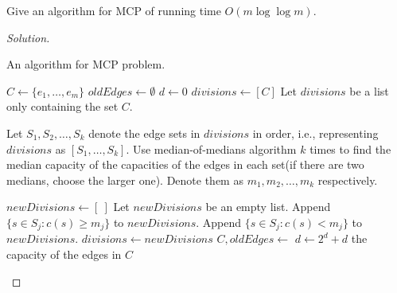     \newpage
    
    \begin{thm}{}{}
        Give an algorithm for MCP of running time $O(m\log\log m)$.
    \end{thm}
    \begin{proof}[Solution]
        \ 
        
        \begin{algorithm}
            \caption{An algorithm for MCP problem.}
            \begin{algorithmic}
                \State $C\gets \{e_1,\ldots,e_m\}$
                \State $oldEdges \gets \emptyset$
                \State $d\gets 0$
                 
                \State $divisions\gets [C]$ \Comment Let $divisions$ be a list only containing the set $C$.
                 
                
                \State Let $S_1, S_2, \ldots, S_k$ denote the edge sets in $divisions$ in order, i.e., representing $divisions$ as $[S_1, \ldots, S_k]$.
                \State Use median-of-medians algorithm $k$ times to find the median capacity of the capacities of the edges in each set(if there are two medians, choose the larger one). Denote them as $m_1, m_2, \ldots, m_k$ respectively.
                
                \State $newDivisions \gets [\ ]$ \Comment Let $newDivisions$ be an empty list.
                 
                \State Append $\{s\in S_{j}:c(s) \geqslant m_{j}\}$ to $newDivisions$.
                \State Append $\{s\in S_{j}:c(s) < m_{j}\}$ to $newDivisions$.
                \EndFor
                \State $divisions \gets newDivisions$
                \EndFor
                \State $C, oldEdges\gets$  %
                \State $d\gets 2^{d}+d$
                \EndWhile
                \State \Return the capacity of the edges in $C$
                \EndFunction
                
                \bigskip
                

\end{algorithmic}
\end{algorithm}
\end{proof}
